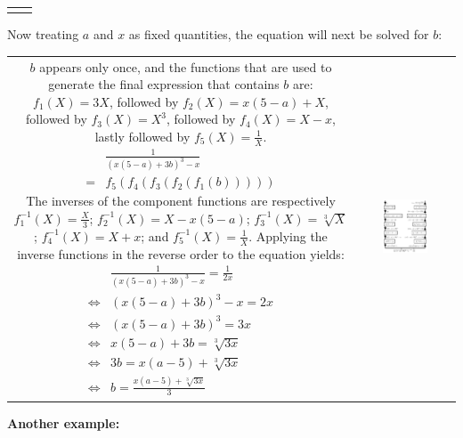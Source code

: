 \documentclass{article}
\begin{document}
\begin{tabular}{cc}
{}
\end{tabular}

Now treating \(a\) and \(x\) as fixed quantities, the equation will next be solved for \(b\):

\begin{tabular}{cc}
\parbox{0.4\textwidth}{
\(b\) appears only once, and the functions that are used to generate the final expression that contains \(b\) are: \(f_1(X) = 3X\), followed by \(f_2(X) = x(5 - a) + X\), followed by \(f_3(X) = X^3\), followed by \(f_4(X) = X - x\), lastly followed by \(f_5(X) = \frac{1}{X}\). 
\begin{align*}
& \frac{1}{(x(5-a) + 3b)^3 - x} \\
= & f_5(f_4(f_3(f_2(f_1(b)))))
\end{align*}
The inverses of the component functions are respectively \(f_1^{-1}(X) = \frac{X}{3}\); \(f_2^{-1}(X) = X - x(5 - a)\); \(f_3^{-1}(X) = \sqrt[3]{X}\); \(f_4^{-1}(X) = X + x\); and \(f_5^{-1}(X) = \frac{1}{X}\). Applying the inverse functions in the reverse order to the equation yields:
\begin{align*}
& \frac{1}{(x(5-a) + 3b)^3 - x} = \frac{1}{2x} \\
\iff & (x(5-a) + 3b)^3 - x = 2x \\
\iff & (x(5-a) + 3b)^3 = 3x \\
\iff & x(5-a) + 3b = \sqrt[3]{3x} \\
\iff & 3b = x(a-5) + \sqrt[3]{3x} \\
\iff & b = \frac{x(a-5) + \sqrt[3]{3x}}{3}
\end{align*}
} & \parbox{0.5\textwidth}{
\includegraphics[width = 0.5\textwidth]{solving_equation_3}
}
\end{tabular}

\textbf{Another example:}
\end{document}
